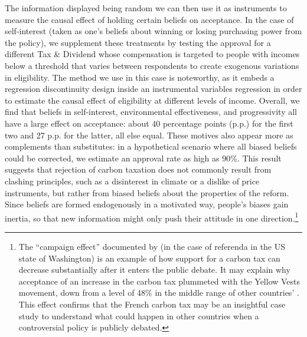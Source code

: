 \documentclass[12pt]{article} %
\begin{document}
The information displayed being random we can then use it as instruments to measure the causal effect of holding certain beliefs on acceptance. In the case of self-interest (taken as one's beliefs about winning or losing purchasing power from the policy), we supplement these treatments by testing the approval for a different Tax \& Dividend whose compensation is targeted to people with incomes below a threshold that varies between respondents to create exogenous variations in eligibility. The method we use in this case is noteworthy, as it embeds a regression discontinuity design inside an instrumental variables regression in order to estimate the causal effect of eligibility at different levels of income. Overall, we find that beliefs in self-interest, environmental effectiveness, and progressivity all have a large effect on acceptance: about 40 percentage points (p.p.) for the first two and 27 p.p. for the latter, all else equal. These motives also appear more as complements than substitutes: in a hypothetical scenario where all biased beliefs could be corrected, we estimate an approval rate as high as 90\%. This result suggests that rejection of carbon taxation does not commonly result from clashing principles, such as a disinterest in climate or a dislike of price instruments, but rather from biased beliefs about the properties of the reform. Since beliefs are formed endogenously in a motivated way, people's biases gain inertia, so that new information might only push their attitude in one direction.\footnote{The ``campaign effect'' documented by \citet{anderson_can_2019} (in the case of referenda in the US state of Washington) is an example of how support for a carbon tax can decrease substantially after it enters the public debate. It may explain why acceptance of an increase in the carbon tax plummeted with the Yellow Vests movement, down from a level of 48\% \citep{ademe_representations_2018} in the middle range of other countries' \citep{brechin_public_2010}. This effect confirms that the French carbon tax may be an insightful case study to understand what could happen in other countries when a controversial policy is publicly debated.} %
\end{document}
